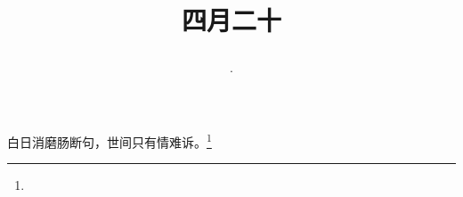 \title{\date[d=27,m=5,y=2024][year:cn-y,年,month:cn,day:cn,日,·,weekday]·四月二十 }
白日消磨肠断句，世间只有情难诉。\footnote{ }

